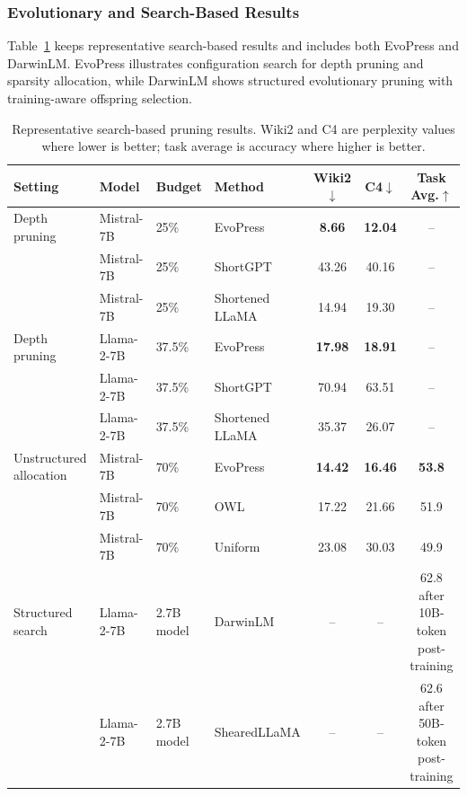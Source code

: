 \subsubsection{Evolutionary and Search-Based Results}

Table~\ref{tab:search_summary} keeps representative search-based results and includes both EvoPress and DarwinLM. EvoPress illustrates configuration search for depth pruning and sparsity allocation, while DarwinLM shows structured evolutionary pruning with training-aware offspring selection.

\begin{table}[H]
	\centering
	\caption{Representative search-based pruning results. Wiki2 and C4 are perplexity values where lower is better; task average is accuracy where higher is better.}
	\label{tab:search_summary}
	\begin{tabular}{@{}llllccc@{}}
		\toprule
		\textbf{Setting} & \textbf{Model} & \textbf{Budget} & \textbf{Method} & \textbf{Wiki2$\downarrow$} & \textbf{C4$\downarrow$} & \textbf{Task Avg.$\uparrow$} \\
		\midrule
		Depth pruning
		  & Mistral-7B & 25\% & EvoPress & \textbf{8.66} & \textbf{12.04} & -- \\
		  & Mistral-7B & 25\% & ShortGPT & 43.26 & 40.16 & -- \\
		  & Mistral-7B & 25\% & Shortened LLaMA & 14.94 & 19.30 & -- \\
		\midrule
		Depth pruning
		  & Llama-2-7B & 37.5\% & EvoPress & \textbf{17.98} & \textbf{18.91} & -- \\
		  & Llama-2-7B & 37.5\% & ShortGPT & 70.94 & 63.51 & -- \\
		  & Llama-2-7B & 37.5\% & Shortened LLaMA & 35.37 & 26.07 & -- \\
		\midrule
		Unstructured allocation
		  & Mistral-7B & 70\% & EvoPress & \textbf{14.42} & \textbf{16.46} & \textbf{53.8} \\
		  & Mistral-7B & 70\% & OWL & 17.22 & 21.66 & 51.9 \\
		  & Mistral-7B & 70\% & Uniform & 23.08 & 30.03 & 49.9 \\
		\midrule
		Structured search
		  & Llama-2-7B & 2.7B model & DarwinLM & -- & -- & 62.8 after 10B-token post-training \\
		  & Llama-2-7B & 2.7B model & ShearedLLaMA & -- & -- & 62.6 after 50B-token post-training \\
		\bottomrule
	\end{tabular}
\end{table}

